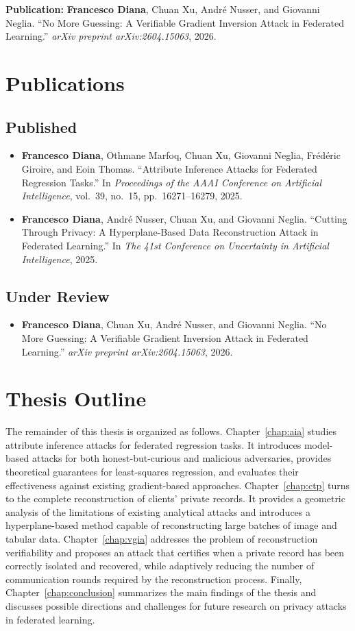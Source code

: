 \medskip
\noindent\textbf{Publication:}
    \textbf{Francesco Diana}, Chuan Xu, André Nusser, and Giovanni Neglia.
    ``No More Guessing: A Verifiable Gradient Inversion Attack in Federated
    Learning.''
    \emph{arXiv preprint arXiv:2604.15063}, 2026.

\section{Publications}
\subsection*{Published}
\noindent\begin{itemize}
    \item  \textbf{Francesco Diana}, Othmane Marfoq, Chuan Xu, Giovanni Neglia,
Frédéric Giroire, and Eoin Thomas.
``Attribute Inference Attacks for Federated Regression Tasks.''
In \emph{Proceedings of the AAAI Conference on Artificial Intelligence},
vol.~39, no.~15, pp.~16271--16279, 2025.
    \item \textbf{Francesco Diana}, André Nusser, Chuan Xu, and Giovanni Neglia.
``Cutting Through Privacy: A Hyperplane-Based Data Reconstruction Attack
in Federated Learning.''
In \emph{The 41st Conference on Uncertainty in Artificial Intelligence},
2025.
\end{itemize}

\subsection*{Under Review}
\noindent\begin{itemize}
    \item \textbf{Francesco Diana}, Chuan Xu, André Nusser, and Giovanni Neglia.
    ``No More Guessing: A Verifiable Gradient Inversion Attack in Federated
    Learning.''
    \emph{arXiv preprint arXiv:2604.15063}, 2026.
\end{itemize}

\section{Thesis Outline}
The remainder of this thesis is organized as follows. Chapter~\ref{chap:aia}
studies attribute inference attacks for federated regression tasks. It introduces
model-based attacks for both honest-but-curious and malicious adversaries,
provides theoretical guarantees for least-squares regression, and evaluates
their effectiveness against existing gradient-based approaches.
Chapter~\ref{chap:ctp} turns to the complete reconstruction of clients' private
records. It provides a geometric analysis of the limitations of existing
analytical attacks and introduces a hyperplane-based method capable of
reconstructing large batches of image and tabular data.
Chapter~\ref{chap:vgia} addresses the problem of reconstruction verifiability
and proposes an attack that certifies when a private record has been correctly
isolated and recovered, while adaptively reducing the number of communication
rounds required by the reconstruction process. Finally, Chapter~\ref{chap:conclusion}
summarizes the main findings of the thesis and discusses possible directions and challenges
for future research on privacy attacks in federated
learning.
